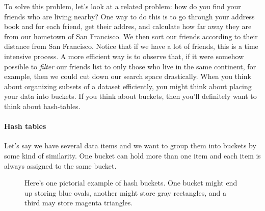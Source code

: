 \documentclass[12pt]{article}
\begin{document}
To solve this problem, let's look at a related problem: how do you find your friends who are living nearby? One way to do this is to go through your address book and for each friend, get their addres, and calculate how far away they are from our hometown of San Francisco. We then sort our friends according to their distance from San Francisco. Notice that if we have a lot of friends, this is a time intensive process. A more efficient way is to observe that, if it were somehow possible to \emph{filter} our friends list to only those who live in the same continent, for example, then we could cut down our search space drastically. When you think about organizing subsets of a dataset efficiently, you might think about placing your data into buckets. If you think about buckets, then you'll definitely want to think about hash-tables.

\paragraph{Hash tables} Let's say we have several data items and we want to group them into buckets by some kind of similarity. One bucket can hold more than one item and each item is always assigned to the same bucket.

\begin{figure}[h]
\begin{center}
\end{center}
\caption{Here's one pictorial example of hash buckets. One bucket might end up storing blue ovals, another might store gray rectangles, and a third may store magenta triangles.}
\end{figure}
\end{document}
